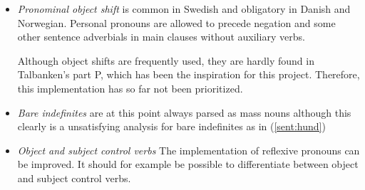 \documentclass[runningheads,a4paper]{llncs}
\begin{document}
\begin{itemize}
\item
\textit{Pronominal object shift} is common in Swedish and obligatory in Danish and Norwegian.
Personal pronouns are allowed to precede negation and some other sentence adverbials %
in main clauses without auxiliary verbs.


Although object shifts are frequently used, they are hardly found in
Talbanken's part P, which has been the inspiration for this project.
Therefore, this implementation has so far not been prioritized.\\

\item
\textit{Bare indefinites} are at this point always parsed as mass nouns
    \label{sent:water}
although this clearly is a unsatisfying analysis for bare indefinites as in (\ref{sent:hund})
\label{sent:hund}
\vspace{3mm}

\item
\textit{Object and subject control verbs}
The implementation of reflexive pronouns can be improved.  
It should for example be possible to differentiate between 
object and subject control verbs.

\end{itemize}
\end{document}
